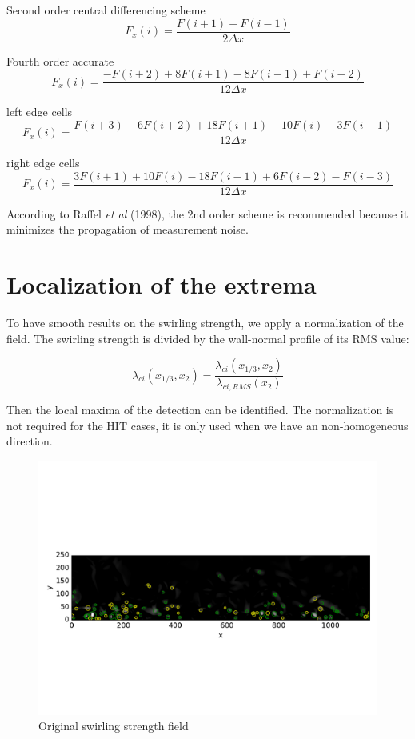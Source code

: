 \documentclass[12pt, a4paper, openany]{memoir}
\begin{document}
Second order central differencing scheme
\begin{equation}
F_x(i) = \frac{F(i+1)-F(i-1)}{2 \Delta x}
\end{equation}

Fourth order accurate
\begin{equation}
F_x(i) = \frac{-F(i+2)+8F(i+1)-8F(i-1)+F(i-2)}{12 \Delta x}
\end{equation}

left edge cells
\begin{equation}
F_x(i) = \frac{F(i+3)-6F(i+2)+18F(i+1)-10F(i) -3F(i-1)}{12 \Delta x}
\end{equation}

right edge cells
\begin{equation}
F_x(i) = \frac{3F(i+1)+10F(i)-18F(i-1)+6F(i-2) -F(i-3)}{12 \Delta x}
\end{equation}


According to Raffel \textit{et al} (1998), the 2nd order scheme is recommended because it minimizes the propagation of measurement noise. 

\section{Localization of the extrema}

To have smooth results on the swirling strength, we apply a normalization of the field. The swirling strength is divided by the wall-normal profile of its RMS value:

\begin{equation}
\bar{\lambda}_{ci}(x_{1/3},x_2) = \frac{\lambda_{ci}(x_{1/3},x_2)}{\lambda_{ci,RMS}(x_2)}
\end{equation}

Then the local maxima of the detection can be identified. The normalization is not required for the HIT cases, it is only used when we have an non-homogeneous direction.

\begin{figure}[h]
	\centering
	\includegraphics[trim=0 130 0 130 ,clip, width=\textwidth]{figure/PIVnonnormalized.pdf}
	\caption{Original swirling strength field}
	\label{fig:nonnorm}
\end{figure}
\end{document}
